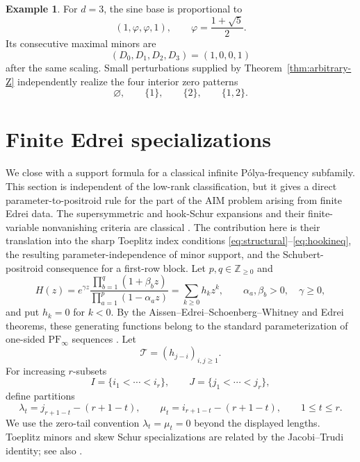 \documentclass{amsart}
\numberwithin{equation}{section}
\theoremstyle{definition}
\newtheorem{example}[theorem]{Example}
\theoremstyle{remark}
\newcommand{\PFinfty}{\mathrm{PF}_{\infty}}
\begin{document}
\begin{example}\label{ex:golden}
For $d=3$, the sine base is proportional to
\[
 (1,\varphi,\varphi,1),
 \qquad
 \varphi=\frac{1+\sqrt5}{2}.
\]
Its consecutive maximal minors are
\[
 (D_0,D_1,D_2,D_3)=(1,0,0,1)
\]
after the same scaling.  Small perturbations supplied by Theorem~\ref{thm:arbitrary-Z} independently realize the four interior zero patterns
\[
 \varnothing,\qquad\{1\},\qquad\{2\},\qquad\{1,2\}.
\]
\end{example}


\section{Finite Edrei specializations}\label{sec:edrei}

We close with a support formula for a classical infinite P\'olya-frequency subfamily.  This section is independent of the low-rank classification, but it gives a direct parameter-to-positroid rule for the part of the AIM problem arising from finite Edrei data.  The supersymmetric and hook-Schur expansions and their finite-variable nonvanishing criteria are classical \cite{BereleRegev,Stembridge,Macdonald}.  The contribution here is their translation into the sharp Toeplitz index conditions \eqref{eq:structural}--\eqref{eq:hookineq}, the resulting parameter-independence of minor support, and the Schubert-positroid consequence for a first-row block.  Let $p,q\in\mathbb Z_{\ge0}$ and
\begin{equation}\label{eq:EdreiH}
 H(z)=e^{\gamma z}
 \frac{\prod_{b=1}^{q}(1+\beta_bz)}
      {\prod_{a=1}^{p}(1-\alpha_az)}
 =\sum_{k\ge0}h_kz^k,
 \qquad
 \alpha_a,\beta_b>0,
 \quad \gamma\ge0,
\end{equation}
and put $h_k=0$ for $k<0$.  By the Aissen--Edrei--Schoenberg--Whitney and Edrei theorems, these generating functions belong to the standard parameterization of one-sided $\PFinfty$ sequences \cite{AESW,Edrei,RietschSurvey}.  Let
\begin{equation}\label{eq:infiniteT}
 \mathcal T=(h_{j-i})_{i,j\ge1}.
\end{equation}
For increasing $r$-subsets
\[
 I=\{i_1<\cdots<i_r\},
 \qquad
 J=\{j_1<\cdots<j_r\},
\]
define partitions
\begin{equation}\label{eq:lambdamu}
 \lambda_t=j_{r+1-t}-(r+1-t),
 \qquad
 \mu_t=i_{r+1-t}-(r+1-t),
 \qquad 1\le t\le r.
\end{equation}
We use the zero-tail convention $\lambda_t=\mu_t=0$ beyond the displayed lengths.  Toeplitz minors and skew Schur specializations are related by the Jacobi--Trudi identity; see also \cite{GarciaTierz,Macdonald}.
\end{document}
